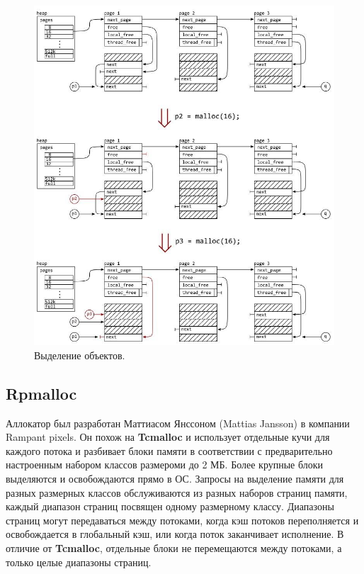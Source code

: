 \begin{figure}[!h]
	\begin{center}
		\includegraphics[scale=0.8]{images/mimalloc-alloc.jpg}
		\caption{Выделение объектов.}
		\label{mimalloc-alloc}
	\end{center}
\end{figure}

\subsection{Rpmalloc}

Аллокатор был разработан Маттиасом Янссоном (Mattias Jansson) в компании Rampant pixels. Он похож на \textbf{Tcmalloc} и использует отдельные кучи для каждого потока и разбивает блоки памяти в соответствии с предварительно настроенным набором классов размероми до 2 МБ. Более крупные блоки выделяются и освобождаются прямо в ОС. Запросы на выделение памяти для разных размерных классов обслуживаются из разных наборов страниц памяти, каждый диапазон страниц посвящен одному размерному классу. Диапазоны страниц могут передаваться между потоками, когда кэш потоков переполняется и освобождается в глобальный кэш, или когда поток заканчивает исполнение. В отличие от \textbf{Tcmalloc}, отдельные блоки не перемещаются между потоками, а только целые диапазоны страниц.

